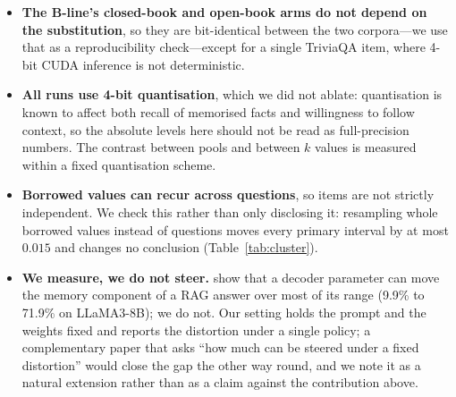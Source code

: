 \documentclass[11pt]{article}
\begin{document}
\begin{itemize}
earlier run stored its oracle fields under the previous (v2) scorer; we never quote those
stored values, and all comparisons are made under a single scorer.
\item \textbf{The B-line's closed-book and open-book arms do not depend on the
substitution}, so they are bit-identical between the two corpora---we use that as a
reproducibility check---except for a single TriviaQA item, where 4-bit CUDA inference is not
deterministic.
\item \textbf{All runs use 4-bit quantisation}, which we did not ablate: quantisation is
known to affect both recall of memorised facts and willingness to follow context, so the
absolute levels here should not be read as full-precision numbers. The contrast between
pools and between $k$ values is measured within a fixed quantisation scheme.
\item \textbf{Borrowed values can recur across questions}, so items are not strictly
independent. We check this rather than only disclosing it: resampling whole borrowed values
instead of questions moves every primary interval by at most $0.015$ and changes no
conclusion (Table~\ref{tab:cluster}).
\item \textbf{We measure, we do not steer.} \citet{bi2026parameters} show that a decoder
parameter can move the memory component of a RAG answer over most of its range
(9.9\% to 71.9\% on {LLaMA3-8B}); we do not. Our setting holds the prompt and the
weights fixed and reports the distortion under a single policy; a complementary paper
that asks ``how much can be steered under a fixed distortion'' would close the gap the
other way round, and we note it as a natural extension rather than as a claim against
the contribution above.
\end{itemize}

\end{document}
